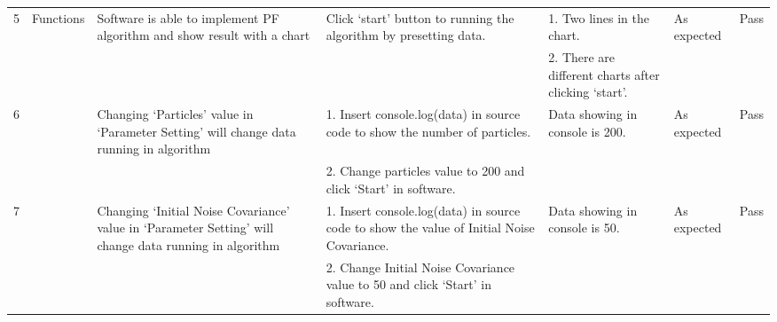 \documentclass{article}
\begin{document}
\begin{longtable}{|p{10pt}|p{60pt}|p{95pt}|p{130pt}|p{60pt}|p{55pt}|p{25pt}|}
5  & Functions           & {Software is able to implement PF algorithm and show result with a chart}                                  & {Click ‘start’ button to running the algorithm by presetting data.}               & 1.    Two lines in the chart.                                                                          & {As expected}                              & {Pass} \\ \cline{5-5}
                    &                                       &                                                                                                                           &                                                                                                  & 2.    There are different charts after clicking ‘start’.                                               &                                                           &                       \\ \cline{1-1} \cline{3-7}
6  &                                       & {Changing ‘Particles’ value in ‘Parameter Setting’ will change data running in algorithm}                  & 1.    Insert console.log(data) in source code to show the number of particles.                   & {Data showing in console is 200.}                                                       & {As expected}                              & {Pass} \\ \cline{4-4}
                    &                                       &                                                                                                                           & 2.    Change particles value to 200 and click ‘Start’ in software.                               &                                                                                                        &                                                           &                       \\ \cline{1-1} \cline{3-7}
7  &                                       & {Changing ‘Initial Noise Covariance’ value in ‘Parameter Setting’ will change data running in algorithm}   & 1.    Insert console.log(data) in source code to show the value of Initial Noise Covariance.     & {Data showing in console is 50.}                                                        & {As expected}                              & {Pass} \\ \cline{4-4}
                    &                                       &                                                                                                                           & 2.    Change Initial Noise Covariance value to 50 and click ‘Start’ in software.                 &                                                                                                        &                                                           &                       \\ \cline{1-1} \cline{3-7}

\end{longtable}
\end{document}
